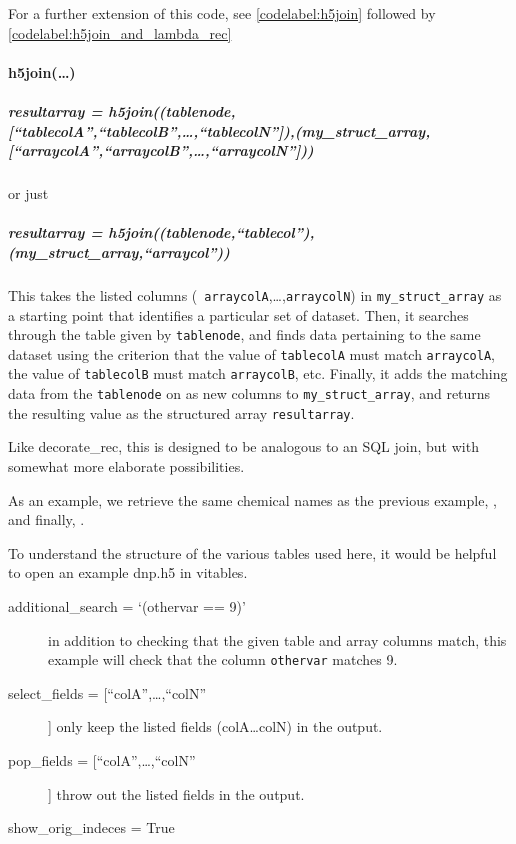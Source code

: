 For a further extension of this code, see \ref{codelabel:h5join} followed by \ref{codelabel:h5join_and_lambda_rec}
\paragraph{h5join(\ldots)}\label{sec:writeup_software_h5inlist}
\subparagraph{resultarray = h5join((tablenode,[``tablecolA'',``tablecolB'',\ldots,``tablecolN'']),(my\_struct\_array,[``arraycolA'',``arraycolB'',\ldots,``arraycolN'']))}

or just

\subparagraph{resultarray = h5join((tablenode,``tablecol''),(my\_struct\_array,``arraycol''))}
This takes the listed columns (\ie~\texttt{arraycolA},\ldots,\texttt{arraycolN}) in
    \texttt{my\_struct\_array} as a starting point that identifies a
    particular set of dataset.
Then, it searches through the table given by \texttt{tablenode}, and finds
    data pertaining to the same dataset using the criterion that
    the value of \texttt{tablecolA} must match \texttt{arraycolA}, the value of
    \texttt{tablecolB} must match \texttt{arraycolB}, etc.
Finally, it adds the matching data from the \texttt{tablenode} on as new
    columns to \texttt{my\_struct\_array}, and returns the resulting value
    as the structured array \texttt{resultarray}.

Like decorate\_rec, this is designed to be analogous to an SQL
    join, but with somewhat more elaborate possibilities.

As an example, we retrieve the same chemical names as the
    previous example, , and finally, .

To understand the structure of the various tables used here, it
    would be helpful to open an example dnp.h5 in vitables.

    \begin{mykwargs}
        \begin{description}
            \item[additional\_search = `(othervar == 9)']
                in addition to checking that the given table and
                array columns match, this example will check that the
                column \texttt{othervar} matches 9.
            \item[select\_fields = [``colA'',\ldots,``colN''] ] only
                keep the listed fields (colA\ldots colN) in the output.
            \item[pop\_fields = [``colA'',\ldots,``colN''] ] 
                throw out the listed fields in the output.
            \item[show\_orig\_indeces = True]
        \end{description}
    \end{mykwargs}


